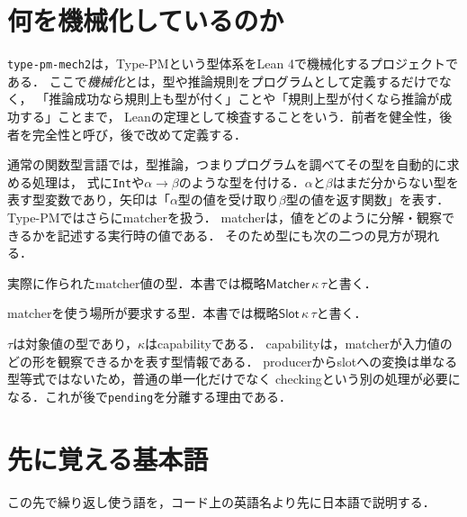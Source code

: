 \documentclass[11pt,a4paper,oneside]{ltjsbook}
\newcommand{\code}[1]{\texttt{#1}}
\newcommand{\Matcher}{\mathsf{Matcher}}
\newcommand{\Slot}{\mathsf{Slot}}
\newcommand{\fn}{\mathbin{\to}}
\begin{document}
\section{何を機械化しているのか}

\code{type-pm-mech2}は，Type-PMという型体系をLean 4で機械化するプロジェクトである．
ここで\emph{機械化}とは，型や推論規則をプログラムとして定義するだけでなく，
「推論成功なら規則上も型が付く」ことや「規則上型が付くなら推論が成功する」ことまで，
Leanの定理として検査することをいう．前者を健全性，後者を完全性と呼び，後で改めて定義する．

通常の関数型言語では，型推論，つまりプログラムを調べてその型を自動的に求める処理は，
式に\code{Int}や$\alpha\fn\beta$のような型を付ける．$\alpha$と$\beta$はまだ分からない型を
表す型変数であり，矢印は「$\alpha$型の値を受け取り$\beta$型の値を返す関数」を表す．
Type-PMではさらにmatcherを扱う．
matcherは，値をどのように分解・観察できるかを記述する実行時の値である．
そのため型にも次の二つの見方が現れる．

\begin{description}[leftmargin=8em,style=nextline]
  \item[matcher producer]
    実際に作られたmatcher値の型．本書では概略$\Matcher\,\kappa\,\tau$と書く．
  \item[matcher slot]
    matcherを使う場所が要求する型．本書では概略$\Slot\,\kappa\,\tau$と書く．
\end{description}

$\tau$は対象値の型であり，$\kappa$はcapabilityである．
capabilityは，matcherが入力値のどの形を観察できるかを表す型情報である．
producerからslotへの変換は単なる型等式ではないため，普通の単一化だけでなく
checkingという別の処理が必要になる．これが後で\code{pending}を分離する理由である．

\section{先に覚える基本語}

この先で繰り返し使う語を，コード上の英語名より先に日本語で説明する．
\end{document}
